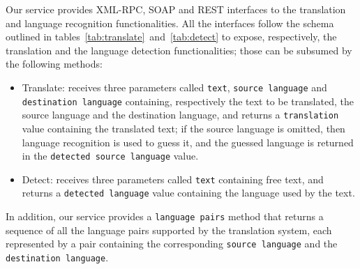 \documentclass[11pt]{article}
\begin{document}

Our service provides XML-RPC, SOAP and REST interfaces to the translation and language 
recognition functionalities. All the interfaces follow the schema outlined in 
tables~\ref{tab:translate}~and~\ref{tab:detect} to expose, respectively, the translation 
and the language detection functionalities; those can be subsumed by the following methods:

\begin{itemize}
 \item Translate: receives three parameters called {\tt\small text}, {\tt\small source~language} 
       and {\tt\small destination language} containing, respectively the text to be translated, 
       the source language and the destination language, and returns a {\tt\small translation} 
       value containing the translated text; if the source language is omitted, then language 
       recognition is used to guess it, and the guessed language is returned in the 
       {\tt\small detected source language} value.
 \item Detect: receives three parameters called {\tt\small text} containing free text, and 
       returns a {\tt\small detected language} value containing the language used by the text.
\end{itemize}

In addition, our service provides a {\tt\small language pairs} method that returns a sequence 
of all the language pairs supported by the translation system, each represented by a pair 
containing the corresponding {\tt\small source language} and the {\tt\small destination language}.

\end{document}
